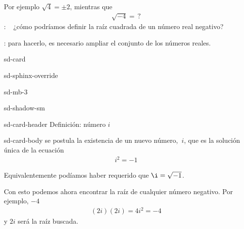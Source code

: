 \documentclass[letterpaper,10pt,english]{jupyterBook}
\begin{document}
\sphinxAtStartPar
Por ejemplo \(\sqrt{4}=\pm 2\), mientras que
\begin{equation*}
\begin{split}\sqrt{-4}= \, ?\end{split}
\end{equation*}
\sphinxAtStartPar
{}: \(~~\) ¿cómo podríamos definir la raíz cuadrada de un número real negativo?

\sphinxAtStartPar
{}: para hacerlo, es necesario ampliar el conjunto de los números reales.

\begin{sphinxuseclass}{sd-card}
\begin{sphinxuseclass}{sd-sphinx-override}
\begin{sphinxuseclass}{sd-mb-3}
\begin{sphinxuseclass}{sd-shadow-sm}
\begin{sphinxuseclass}{sd-card-header}
\sphinxAtStartPar
Definición: número \(i\)

\end{sphinxuseclass}
\begin{sphinxuseclass}{sd-card-body}
\sphinxAtStartPar
se postula la existencia de un nuevo número, \(~i\), que es la solución única de la ecuación \(~\)
\begin{equation*}
\begin{split} i^2 = -1\end{split}
\end{equation*}
\end{sphinxuseclass}
\end{sphinxuseclass}
\end{sphinxuseclass}
\end{sphinxuseclass}
\end{sphinxuseclass}
\sphinxAtStartPar
Equivalentemente podíamos haber requerido que  \(\i = \sqrt{-1}\).

\sphinxAtStartPar
Con esto podemos ahora encontrar la raíz de cualquier número negativo. Por ejemplo, \(-4\)
\begin{equation*}
\begin{split}
(2i)(2i) = 4 i^2 = - 4
\end{split}
\end{equation*}
\sphinxAtStartPar
y \(2i\) será la raíz buscada.
\end{document}
